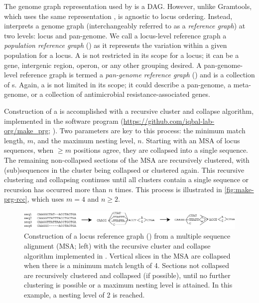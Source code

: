 The genome graph representation used by \pandora{} is a DAG. However, unlike Gramtools, which uses the same representation \cite{gramtools2021}, \pandora{} is agnostic to locus ordering. Instead, \pandora{} interprets a genome graph (interchangeably referred to as a \emph{reference graph}) at two levels: locus and pan-genome. We call a locus-level reference graph a \emph{population reference graph} (\prg{}) as it represents the variation within a given population for a locus. A \prg{} is not restricted in its scope for a locus; it can be a gene, intergenic region, operon, or any other grouping desired. A pan-genome-level reference graph is termed a \emph{pan-genome reference graph} (\panrg{}) and is a collection of \prg{}s. Again, a \panrg{} is not limited in its scope; it could describe a pan-genome, a meta-genome, or a collection of antimicrobial resistance-associated genes.

Construction of a \prg{} is accomplished with a recursive cluster and collapse algorithm, implemented in the software program \makeprg{} (\url{https://github.com/iqbal-lab-org/make_prg}; \cite{rachelthesis,pandora}). Two parameters are key to this process: the minimum match length, $m$, and the maximum nesting level, $n$. Starting with an MSA of locus sequences, when $\ge m$ positions agree, they are collapsed into a single sequence. The remaining non-collapsed sections of the MSA are recursively clustered, with (sub)sequences in the cluster being collapsed or clustered again. This recursive clustering and collapsing continues until all clusters contain a single sequence or recursion has occurred more than $n$ times. This process is illustrated in \autoref{fig:make-prg-rcc}, which uses $m=4$ and $n\ge 2$.

\begin{figure}
\centering
\includegraphics[width=1\columnwidth]{Chapter0/Figs/make-prg.png}
\caption{Construction of a locus reference graph (\prg{}) from a multiple sequence alignment (MSA; left) with the recursive cluster and collapse algorithm implemented in \makeprg{}. Vertical slices in the MSA are collapsed when there is a minimum match length of 4. Sections not collapsed are recursively clustered and collapsed (if possible), until no further clustering is possible or a maximum nesting level is attained. In this example, a nesting level of 2 is reached.}
\label{fig:make-prg-rcc}
\end{figure}

